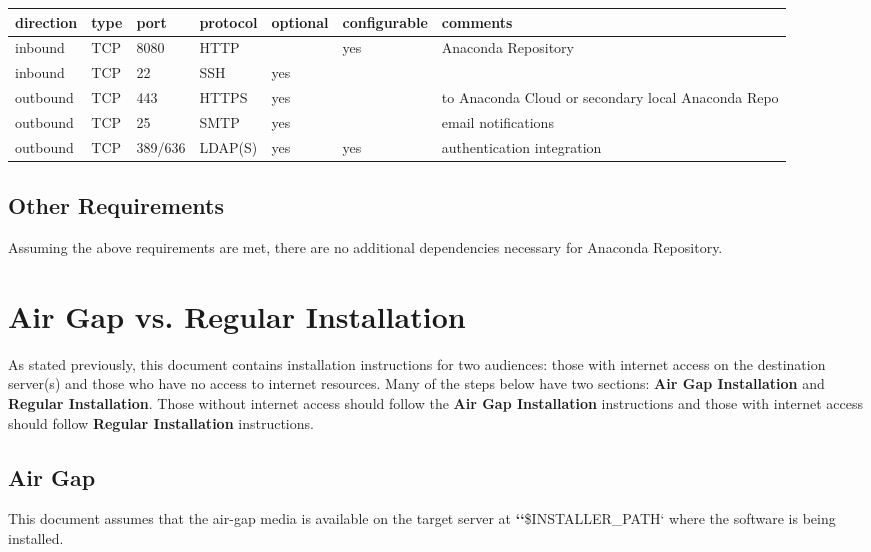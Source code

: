 \documentclass[letterpaper,10pt,openany,oneside]{sphinxmanual}
\begin{document}
\begin{tabulary}{\linewidth}{|L|L|L|L|L|L|L|}
\hline

direction
 & 
type
 & 
port
 & 
protocol
 & 
optional
 & 
configurable
 & 
comments
\\
\hline
inbound
 & 
TCP
 & 
8080
 & 
HTTP
 &  & 
yes
 & 
Anaconda Repository
\\
\hline
inbound
 & 
TCP
 & 
22
 & 
SSH
 & 
yes
 &  & \\
\hline
outbound
 & 
TCP
 & 
443
 & 
HTTPS
 & 
yes
 &  & 
to Anaconda Cloud or secondary local Anaconda Repo
\\
\hline
outbound
 & 
TCP
 & 
25
 & 
SMTP
 & 
yes
 &  & 
email notifications
\\
\hline
outbound
 & 
TCP
 & 
389/636
 & 
LDAP(S)
 & 
yes
 & 
yes
 & 
authentication integration
\\
\hline\end{tabulary}



\subsection{Other Requirements}
\label{AnacondaRepository:other-requirements}
Assuming the above requirements are met, there are no additional
dependencies necessary for Anaconda Repository.


\section{Air Gap vs. Regular Installation}
\label{AnacondaRepository:air-gap-vs-regular-installation}
As stated previously, this document contains installation instructions
for two audiences: those with internet access on the destination
server(s) and those who have no access to internet resources. Many of
the steps below have two sections: \textbf{Air Gap Installation} and
\textbf{Regular Installation}. Those without internet access should follow
the \textbf{Air Gap Installation} instructions and those with internet access
should follow \textbf{Regular Installation} instructions.


\subsection{Air Gap}
\label{AnacondaRepository:air-gap}
This document assumes that the air-gap media is available on
the target server at {\color{red}\bfseries{}{}`{}`}\$INSTALLER\_PATH{}` where the software is being installed.
\end{document}
